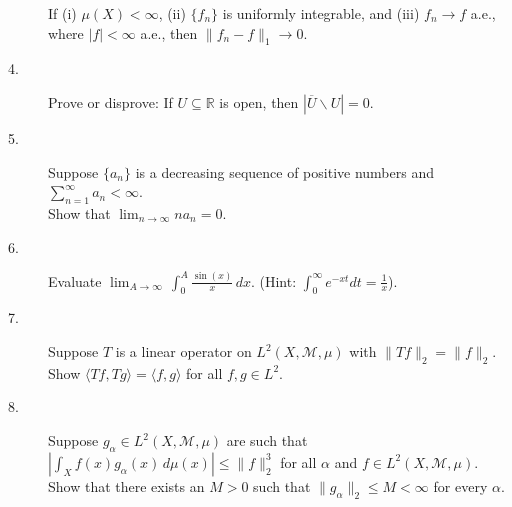 \documentclass[bbb]{report}
\def\ds{\displaystyle}
\def\R{{\mathbb R}}
\begin{document}
\begin{large}
\begin{description}
\item[\quad]
If (i) $\mu(X)< \infty$, (ii) $\{f_n\}$ is uniformly integrable, and  
(iii) $f_n\to f$ a.e., where $|f| < \infty$ a.e., then
 $\|f_n-f\|_1 \to 0$.

\vspace{.05in}

\item[4.]
Prove or disprove:  { If $U\subseteq \R$ is open,
then $|\overline U \backslash U|=0$}.

\vspace{.05in}


\item[5.]
Suppose $\{a_n\}$ is a decreasing sequence of positive numbers and
$\ds\sum^\infty_{n=1} a_n<\infty$.
\\
Show that $\ds\lim_{n\to \infty} n a_n=0$.

\vspace{.05in}

\item[6.]
Evaluate $\ds\lim_{A\to\infty} \,\int^A_0 \frac{\sin(x)}{x}\,dx$.
(Hint: $\ds\int^\infty_0 e^{-xt} dt=\frac{1}{x}$).


\vspace{.05in}

\item[7.]
Suppose $T$ is a linear operator on $L^2(X,\mathcal M, \mu)$ with
$\|Tf\|_2=\|f\|_2$.
\\
Show $\langle Tf,Tg \rangle = \langle f,g \rangle$
for all $f,g\in L^2$.


\vspace{.05in}

\item[8.]
Suppose $g_\alpha\in L^2(X, \mathcal M, \mu)$ are such that
$\ds \left|\int_X f(x) g_\alpha(x)\,d\mu(x) \right| \leq \|f\|^3_2$
for all $\alpha$ and $f \in L^2(X, \mathcal M, \mu).$
Show that there exists an $ M>0 $ such that
$\|g_\alpha\|_2 \leq M<\infty $ for every $ \alpha$.

\vfill

\end{description}

\end{large}
\end{document}
